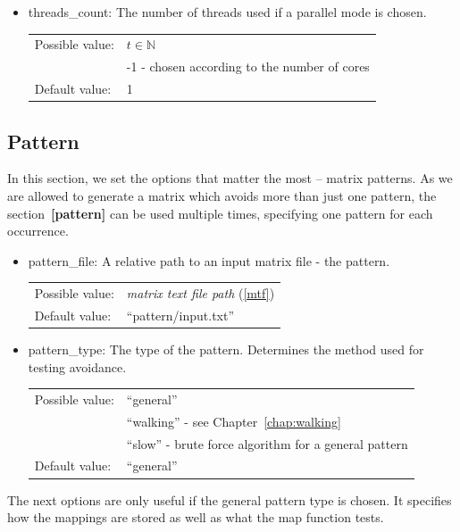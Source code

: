 \begin{itemize}
\item threads\_count: The number of threads used if a parallel mode is chosen.

\begin{tabular}{ll}
Possible value: & $t\in\mathbb{N}$ \\
& -1 - chosen according to the number of cores \\
Default value: & 1
\end{tabular}
\end{itemize}

\subsection{Pattern}
In this section, we set the options that matter the most -- matrix patterns. As we are allowed to generate a matrix which avoids more than just one pattern, the section~\textbf{[pattern]} can be used multiple times, specifying one pattern for each occurrence.
\begin{itemize}
\item pattern\_file: A relative path to an input matrix file - the pattern.

\begin{tabular}{ll}
Possible value: & \textit{matrix text file path} (\ref{mtf}) \\
Default value: & ``pattern/input.txt''
\end{tabular}

\item pattern\_type: The type of the pattern. Determines the method used for testing avoidance.

\begin{tabular}{ll}
Possible value: & ``general'' \\
& ``walking'' - see Chapter~\ref{chap:walking} \\
& ``slow'' - brute force algorithm for a general pattern \\
Default value: & ``general''
\end{tabular}
\end{itemize}

The next options are only useful if the general pattern type is chosen. It specifies how the mappings are stored as well as what the map function tests.


